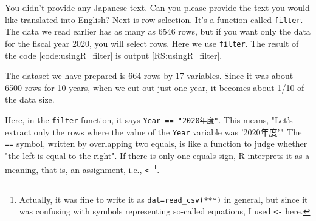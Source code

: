 \documentclass{ltjsbook}
\begin{document}
You didn't provide any Japanese text. Can you please provide the text you would like translated into English?
Next is row selection. It's a function called \verb|filter|. The data we read earlier has as many as 6546 rows, but if you want only the data for the fiscal year 2020, you will select rows. Here we use \verb|filter|. The result of the code \ref{code:usingR_filter} is output \ref{RS:usingR_filter}.


The dataset we have prepared is 664 rows by 17 variables. Since it was about 6500 rows for 10 years, when we cut out just one year, it becomes about 1/10 of the data size.

Here, in the \verb|filter| function, it says \verb|Year == "2020年度"|. This means, "Let's extract only the rows where the value of the \verb|Year| variable was '2020年度'." The \verb|==| symbol, written by overlapping two equals, is like a function to judge whether "the left is equal to the right". If there is only one equals sign, R interprets it as a meaning, that is, an assignment, i.e., \verb|<-|\footnote{Actually, it was fine to write it as \verb|dat=read_csv(***)| in general, but since it was confusing with symbols representing so-called equations, I used \verb|<-| here.}.
\end{document}
